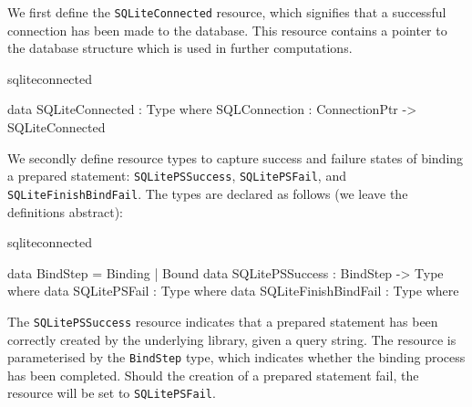 We first define the \texttt{SQLiteConnected} resource, which signifies that a
successful connection has been made to the database. This resource contains a
pointer to the database structure which is used in further computations.

\begin{SaveVerbatim}{sqliteconnected}

data SQLiteConnected : Type where
  SQLConnection : ConnectionPtr -> SQLiteConnected
  
\end{SaveVerbatim}  

\noindent
We secondly define resource types to capture success and failure states
of binding a prepared statement:
\texttt{SQLitePSSuccess}, 
\texttt{SQLitePSFail}, and \texttt{SQLiteFinishBindFail}. The types are
declared as follows (we leave the definitions abstract):

\begin{SaveVerbatim}{sqliteconnected}

data BindStep = Binding | Bound
data SQLitePSSuccess : BindStep -> Type where
data SQLitePSFail : Type where
data SQLiteFinishBindFail : Type where

\end{SaveVerbatim}

%


\noindent
The \texttt{SQLitePSSuccess} resource indicates that a prepared statement has been correctly created by the underlying library, given a query string. The resource is parameterised by the \texttt{BindStep} type, which indicates whether the binding process has been completed. Should the creation of a prepared statement fail, the resource will be set to \texttt{SQLitePSFail}. 


